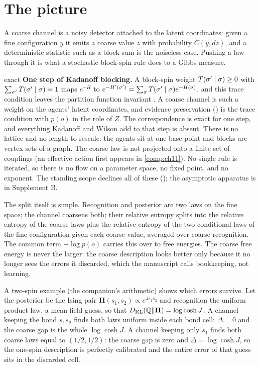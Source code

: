 \section{The picture}
\label{comp:ch09-picture}

A coarse channel is a noisy detector attached to the latent coordinates: given a fine configuration $y$
it emits a coarse value $z$ with probability $C(y,dz)$, and a deterministic statistic such as a block
sum is the noiseless case. Pushing a law through it is what a stochastic block-spin rule does to a Gibbs
measure.

\begin{analogy}{exact}
\textbf{One step of Kadanoff blocking.} A block-spin weight $T(\sigma'\mid\sigma)\geq0$ with
$\sum_{\sigma'}T(\sigma'\mid\sigma)=1$ maps $e^{-H}$ to
$e^{-H'(\sigma')}=\sum_\sigma T(\sigma'\mid\sigma)e^{-H(\sigma)}$, and this trace condition leaves the
partition function invariant \citep{kadanoff1966scaling,Cardy1996}. A coarse channel is such a weight on
the agents' latent coordinates, and evidence preservation () is
the trace condition with $p(o)$ in the role of $Z$. The correspondence is exact for one step, and
everything Kadanoff and Wilson \citep{Wilson1974} add to that step is absent. There is no lattice and no
length to rescale: the agents sit at one base point and blocks are vertex sets of a graph. The coarse
law is not projected onto a finite set of couplings (an effective action first appears in
\cref{comp:ch11}). No single rule is iterated, so there is no flow on a parameter space, no fixed point,
and no exponent. The standing scope declines all of these (); the asymptotic
apparatus is in Supplement B.
\end{analogy}

The split itself is simple. Recognition and posterior are two laws on the fine space; the channel
coarsens both; their relative entropy splits into the relative entropy of the coarse laws plus the
relative entropy of the two conditional laws of the fine configuration given each coarse value, averaged
over coarse recognition. The common term $-\log p(o)$ carries this over to free energies. The coarse free
energy is never the larger: the coarse description looks better only because it no longer sees the
errors it discarded, which the manuscript calls bookkeeping, not learning.

A two-spin example (the companion's arithmetic) shows which errors survive. Let the posterior be the
Ising pair $\boldsymbol\Pi(s_1,s_2)\propto e^{Js_1s_2}$ and recognition the uniform product law, a
mean-field guess, so that $D_{\mathrm{KL}}(\mathbb Q\Vert\boldsymbol\Pi)=\log\cosh J$. A channel keeping the bond
$s_1s_2$ finds both laws uniform inside each bond cell: $\Delta=0$ and the coarse gap is the whole
$\log\cosh J$. A channel keeping only $s_1$ finds both coarse laws equal to $(1/2,1/2)$: the coarse gap
is zero and $\Delta=\log\cosh J$, so the one-spin description is perfectly calibrated and the entire
error of that guess sits in the discarded cell.

